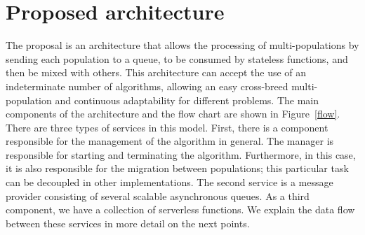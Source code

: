 \documentclass[runningheads]{llncs}
\begin{document}




\section{Proposed architecture}
\label{sec:architecture}

The proposal is an architecture that allows the processing of multi-populations
by sending each population to a queue, to be consumed by stateless functions,
and then be mixed with others.  This architecture can accept the use of an
indeterminate number of algorithms, allowing an easy cross-breed
multi-population and continuous adaptability for different problems. 
The main components of the architecture and the flow chart are shown 
in Figure~\ref{flow}. 
There are three types of services in this model. First, there is a component
responsible for the management of the algorithm in general. The manager is
responsible for starting and terminating the algorithm. Furthermore, in this
case, it is also responsible for the migration between populations; this
particular task can be decoupled in other implementations. The second service is
a message provider consisting of several scalable asynchronous queues. As a
third component, we have a collection of serverless functions. We explain the 
data flow between these services in more detail on the next points.   
\end{document}
